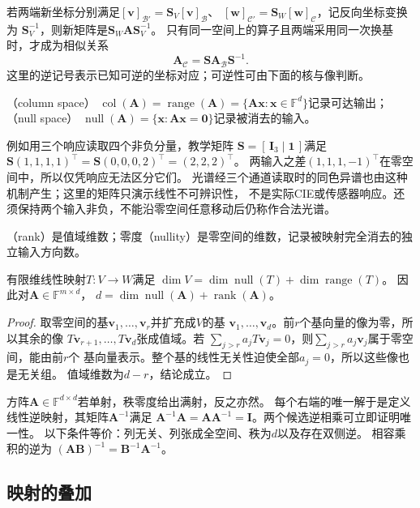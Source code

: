 若两端新坐标分别满足$[\bm v]_{\mathcal B'}=\bm S_V[\bm v]_{\mathcal B}$、
$[\bm w]_{\mathcal C'}=\bm S_W[\bm w]_{\mathcal C}$，记反向坐标变换为
$\bm S_V^{-1}$，则新矩阵是$\bm S_W\bm A\bm S_V^{-1}$。
只有同一空间上的算子且两端采用同一次换基时，才成为相似关系
\begin{equation}
 \bm A_{\mathcal C}=\bm S\bm A_{\mathcal B}\bm S^{-1}.
 \label{eq:linear-algebra-similarity-change-basis}
\end{equation}
这里的逆记号表示已知可逆的坐标对应；可逆性可由下面的核与像判断。


（column space）
$\operatorname{col}(\bm A)=\operatorname{range}(\bm A)
=\{\bm A\bm x:\bm x\in\mathbb F^d\}$记录可达输出；
（null space）
$\operatorname{null}(\bm A)=\{\bm x:\bm A\bm x=\bm0\}$记录被消去的输入。

例如用三个响应读取四个非负分量，教学矩阵
$\bm S=[\,\bm I_3\mid\bm1\,]$满足
$\bm S(1,1,1,1)^\top=\bm S(0,0,0,2)^\top=(2,2,2)^\top$。
两输入之差$(1,1,1,-1)^\top$在零空间中，所以仅凭响应无法区分它们。
光谱经三个通道读取时的同色异谱也由这种机制产生；这里的矩阵只演示线性不可辨识性，
不是实际CIE或传感器响应。还须保持两个输入非负，不能沿零空间任意移动后仍称作合法光谱。

（rank）是值域维数；零度（nullity）是零空间的维数，记录被映射完全消去的独立输入方向数。
\begin{theorem}[秩零度定理]
\label{thm:linear-algebra-rank-nullity}
有限维线性映射$T:V\to W$满足
$\dim V=\dim\operatorname{null}(T)+\dim\operatorname{range}(T)$。
因此对$\bm A\in\mathbb F^{m\times d}$，
$d=\dim\operatorname{null}(\bm A)+\operatorname{rank}(\bm A)$。
\end{theorem}
\begin{proof}
取零空间的基$\bm v_1,\ldots,\bm v_r$并扩充成$V$的基
$\bm v_1,\ldots,\bm v_d$。前$r$个基向量的像为零，所以其余的像
$T\bm v_{r+1},\ldots,T\bm v_d$张成值域。若
$\sum_{j>r}a_jT\bm v_j=0$，则$\sum_{j>r}a_j\bm v_j$属于零空间，能由前$r$个
基向量表示。整个基的线性无关性迫使全部$a_j=0$，所以这些像也是无关组。
值域维数为$d-r$，结论成立。
\end{proof}


方阵$\bm A\in\mathbb F^{d\times d}$若单射，秩零度给出满射，反之亦然。
每个右端的唯一解于是定义线性逆映射，其矩阵$\bm A^{-1}$满足
$\bm A^{-1}\bm A=\bm A\bm A^{-1}=\bm I$。两个候选逆相乘可立即证明唯一性。
以下条件等价：列无关、列张成全空间、秩为$d$以及存在双侧逆。
相容乘积的逆为
$(\bm A\bm B)^{-1}=\bm B^{-1}\bm A^{-1}$。

\subsection{映射的叠加}
\label{sec:linear-algebra-map-addition}

